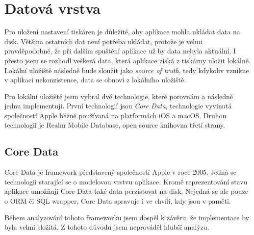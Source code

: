 \section{Datová vrstva}\label{analyza-datova-vrstva}

Pro uložení nastavení tiskáren je důležité, aby aplikace mohla ukládat data na disk.
Většina ostatních dat není potřeba ukládat, protože je velmi pravděpodobné, že při dalším spuštění aplikace už by data nebyla aktuální.
I přesto jsem se rozhodl veškerá data, která aplikace získá z tiskárny uložit lokálně.
Lokální uložiště následně bude sloužit jako \textit{source of truth}, tedy kdykoliv vznikne v aplikaci nekonzistence, data se obnoví z lokálního uložiště.

Pro lokální uložiště jsem vybral dvě technologie, které porovnám a následně jednu implementuji.
První technologií jsou \textit{Core Data}, technologie vyvinutá společností Apple běžně používaná na platformách iOS a macOS.
Druhou technologií je Realm Mobile Database, open source knihovna třetí strany.

\subsection{Core Data}

Core Data je framework představený společností Apple v roce 2005.
Jedná se technologii starající se o modelovou vrstvu aplikace.
Kromě reprezentování stavu aplikace umožňují Core Data také data perzistovat na disk.
Nejedná se ale pouze o ORM či SQL wrapper, Core Data spravuje i ve chvíli, kdy jsou v paměti.

Během analyzování tohoto frameworku jsem dospěl k závěru, že implementace by byla velmi složitá.
Z tohoto důvodu jsem neprováděl hlubší analýzu.

